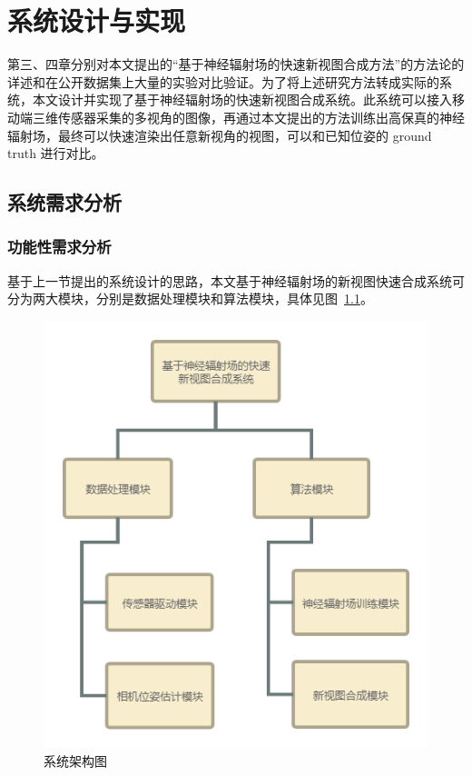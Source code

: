 
\chapter{系统设计与实现}\label{figures_tables}
第三、四章分别对本文提出的“基于神经辐射场的快速新视图合成方法”的方法论的详述和在公开数据集上大量的实验对比验证。为了将上述研究方法转成实际的系统，本文设计并实现了基于神经辐射场的快速新视图合成系统。此系统可以接入移动端三维传感器采集的多视角的图像，再通过本文提出的方法训练出高保真的神经辐射场，最终可以快速渲染出任意新视角的视图，可以和已知位姿的 ground truth 进行对比。

\section{系统需求分析}

\subsection{功能性需求分析}
基于上一节提出的系统设计的思路，本文基于神经辐射场的新视图快速合成系统可分为两大模块，分别是数据处理模块和算法模块，具体见图~\ref{fig:system_struct}。
\begin{figure}[htbp]
    \centering
    \includegraphics[width=0.65\linewidth]{figures/system_struct.png}
    \caption{系统架构图}
    \label{fig:system_struct}
\end{figure}

